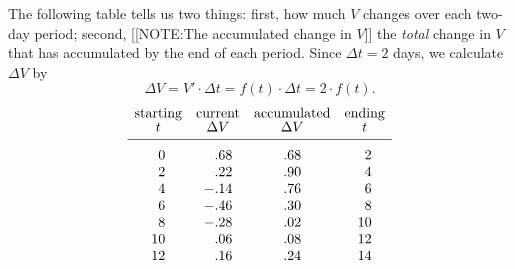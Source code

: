 The following table tells us two things: first, how much $V$ changes
over each two-day period; second,
[[NOTE:The accumulated change in $V$]]
the {\em total\/} change in $V$ that has accumulated by the end of
each period. Since $\Delta t = 2$ days, we calculate $\Delta V$ by
       \[
\Delta V = V' \cdot \Delta t = f(t) \cdot \Delta t 
                = 2 \cdot f(t).
\]
\addtolength{\arraycolsep}{6pt}
{\small 
        \[
\begin{array}{cccc}
        \mbox{starting} & \mbox{current} & \mbox{accumulated} &
                \mbox{ending} \\ [-2pt]
        t & \Delta V &  \Delta V & t \\[2pt] \hline
        \begin{array}{r}
        \rule{0pt}{14pt} 0 \\ 2 \\ 4 \\ 6 \\ 8 \\ 10 \\ 12 
        \end{array}
        &
        \begin{array}{r}
        \rule{0pt}{14pt} .68 \\ .22 \\ -.14 \\ -.46 \\ -.28 \\
                .06 \\ .16 
        \end{array}
        &
        \begin{array}{r}
        \rule{0pt}{14pt} .68 \\ .90 \\ .76 \\ .30 \\ .02 \\
                .08 \\ .24 
        \end{array}
        &
        \begin{array}{r}
        \rule{0pt}{14pt} 2 \\ 4 \\ 6 \\ 8 \\ 10 \\ 12 \\ 14
        \end{array}
\end{array}
\]
}\addtolength{\arraycolsep}{-6pt}

